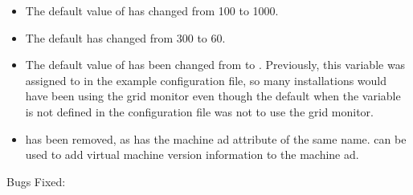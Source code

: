 \begin{itemize}
\item The default value of
   has
  changed from 100 to 1000.

\item The default  has changed from 300 to 60.

\item The default value of  has been
  changed from  to .  Previously, this variable
  was assigned to  in the example configuration file, so
  many installations would have been using the grid monitor even
  though the default when the variable is not defined in the
  configuration file was not to use the grid monitor.

\item {} has been removed, as has the machine ad
attribute of the same name.  can be used to
add virtual machine version information to the machine ad.

\end{itemize}

\noindent Bugs Fixed:

